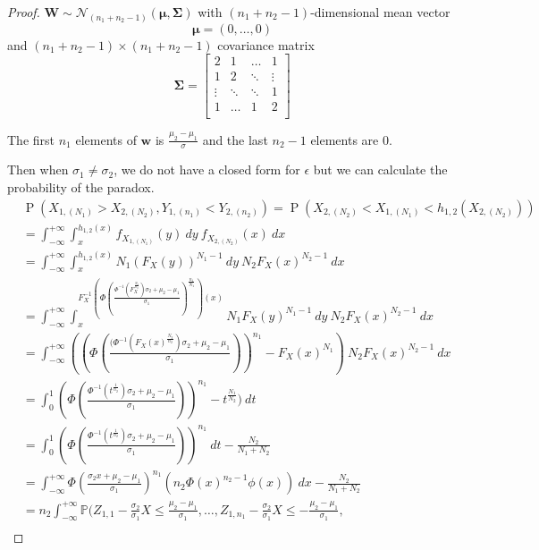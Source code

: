\documentclass[12pt]{article}
\DeclareMathOperator*{\Prob}{P}
\begin{document}
\begin{proof}
$\mathbf{W} \sim \mathcal{N}_{(n_1 + n_2 - 1)}(\boldsymbol{\mu}, \boldsymbol{\Sigma})$ with $(n_1 + n_2 - 1)$-dimensional mean vector $$\boldsymbol{\mu} = (0, \dots, 0)$$ and $(n_1 + n_2 - 1) \times (n_1 + n_2 - 1)$ covariance matrix  $$\boldsymbol{\Sigma} = \begin{bmatrix}
2 & 1 & \dots & 1\\
1 & 2 & \ddots  & \vdots \\
\vdots & \ddots & \ddots & 1\\
1 & \dots & 1 & 2\\
\end{bmatrix}$$

The first $n_1$ elements of $\mathbf{w}$ is $\frac{\mu_2 - \mu_1}{\sigma}$ and the last $n_2-1$ elements are 0. 

Then when $\sigma_1 \neq \sigma_2$, we do not have a closed form for $\epsilon$ but we can calculate the probability of the paradox.
\begin{align*}
  &\Prob\left(X_{1,(N_1)} > X_{2,(N_2)}, Y_{1,(n_1)} < Y_{2,(n_2)}\right) = \Prob\left( X_{2,(N_2)} < X_{1,(N_1)}  < h_{1,2}\left(X_{2,(N_2)}\right)\right) \\
  &= \int_{-\infty}^{+\infty}\int_{x}^{h_{1,2}(x)} f_{X_{1,(N_1)}}(y)\ dy \ f_{X_{2,(N_2)}}(x) \ dx \\
  &= \int_{-\infty}^{+\infty}\int_{x}^{h_{1,2}(x)} N_1 (F_X(y))^{N_1-1}\ dy \ N_2 F_X(x)^{N_2-1}\ dx \\
  &= \int_{-\infty}^{+\infty}\int_{x}^{F_X^{-1}(\Phi(\frac{\Phi^{-1}(F_X^{\frac{N_2}{n_2}})\sigma_2 + \mu_2 - \mu_1}{\sigma_1})^{\frac{n_1}{N_1}})(x)} N_1 F_X(y)^{N_1-1}\ dy \ N_2 F_X(x)^{N_2-1} \ dx \\
  &= \int_{-\infty}^{+\infty} ((\Phi(\frac{(\Phi^{-1}(F_X(x)^{\frac{N_2}{n_2}})\sigma_2 + \mu_2 - \mu_1}{\sigma_1}))^{n_1} - F_X(x)^{N_1}) \ N_2 F_X(x)^{N_2-1}\ dx \\
  & = \int_{0}^{1}(\Phi(\frac{\Phi^{-1}(t^{\frac{1}{n_2}})\sigma_2 + \mu_2 - \mu_1}{\sigma_1}))^{n_1} - t^{\frac{N_1}{N_2}}) \ dt \\
  &= \int_{0}^{1}(\Phi(\frac{\Phi^{-1}(t^{\frac{1}{n_2}})\sigma_2 + \mu_2 - \mu_1}{\sigma_1}))^{n_1} \ dt - \frac{N_2}{N_1 + N_2} \\
  &= \int_{-\infty}^{+\infty} \Phi(\frac{\sigma_2x + \mu_2 - \mu_1}{\sigma_1})^{n_1} (n_2\Phi(x)^{n_2-1}\phi(x))\ dx - \frac{N_2}{N_1 + N_2} \\
  &= n_2 \int_{-\infty}^{+\infty}\mathbb{P}(Z_{1,1} -\frac{\sigma_2}{\sigma_1}X \leq \frac{\mu_2 - \mu_1}{\sigma_1}, \dots, Z_{1,n_1} -\frac{\sigma_2}{\sigma_1}X \leq - \frac{\mu_2 - \mu_1}{\sigma_1}, \\

\end{align*}
\end{proof}
\end{document}
